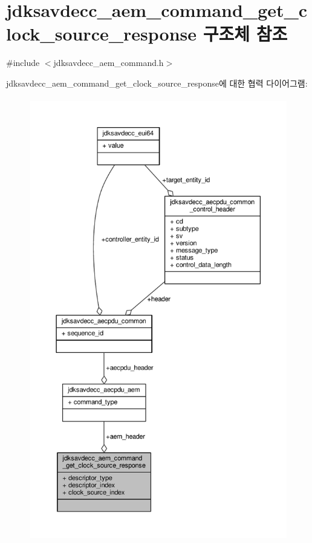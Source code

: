 \hypertarget{structjdksavdecc__aem__command__get__clock__source__response}{}\section{jdksavdecc\+\_\+aem\+\_\+command\+\_\+get\+\_\+clock\+\_\+source\+\_\+response 구조체 참조}
\label{structjdksavdecc__aem__command__get__clock__source__response}


{\ttfamily \#include $<$jdksavdecc\+\_\+aem\+\_\+command.\+h$>$}



jdksavdecc\+\_\+aem\+\_\+command\+\_\+get\+\_\+clock\+\_\+source\+\_\+response에 대한 협력 다이어그램\+:
\nopagebreak
\begin{figure}[H]
\begin{center}
\leavevmode
\includegraphics[height=550pt]{structjdksavdecc__aem__command__get__clock__source__response__coll__graph}
\end{center}
\end{figure}
